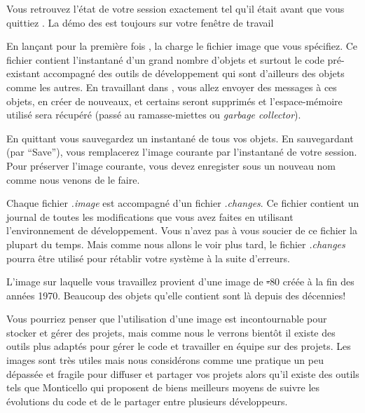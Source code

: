 \documentclass[a4paper,10pt,twoside]{book}
\begin{document}

Vous retrouvez l'état de votre session exactement tel qu'il était
avant que vous quittiez \pharo. La démo des \bamfr{} est toujours sur votre
fenêtre de travail 

En lançant pour la première fois \pharo, la 
charge le fichier image que vous spécifiez. Ce fichier contient
l'instantané d'un grand nombre d'objets et surtout le code
pré-existant accompagné des outils de développement qui sont
d'ailleurs des objets comme les autres. En travaillant dans \pharo, vous
allez envoyer des messages à ces objets, en créer de nouveaux, et
certains seront supprimés et l'espace-mémoire utilisé sera récupéré
(\ie passé au ramasse-miettes ou \emph{garbage collector}).

En quittant \pharo vous sauvegardez un instantané de tous vos objets. En sauvegardant (par ``Save''), vous remplacerez l'image courante par l'instantané de votre session. Pour préserver l'image courante, vous devez enregister sous un nouveau nom comme nous venons de le faire.

Chaque fichier \emph{.image} est accompagné d'un fichier \emph{.changes}.
Ce fichier contient un journal de toutes les modifications que vous avez faites en utilisant l'environnement de développement.
Vous n'avez pas à vous soucier de ce fichier la plupart du temps.
Mais comme nous allons le voir plus tard, le fichier \emph{.changes} pourra être utilisé pour rétablir votre système \pharo à la suite d'erreurs.

L'image sur laquelle vous travaillez provient d'une image de \st-80 créée à la fin des années 1970.
Beaucoup des objets qu'elle contient sont là depuis des décennies!

Vous pourriez penser que l'utilisation d'une image est incontournable pour stocker et gérer des projets, mais comme nous le verrons bientôt il existe des outils plus adaptés pour gérer le code et travailler en équipe sur des projets.
Les images sont très utiles mais nous considérons comme une pratique un peu dépassée et fragile pour diffuser et partager vos projets alors qu'il existe des outils tels que Monticello qui proposent de biens meilleurs moyens de suivre les évolutions du code et de le partager entre plusieurs développeurs.

\end{document}
